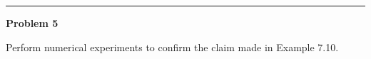 \documentclass[10pt]{article}
\begin{document}



\vskip 1cm
\hrule
{\bf Problem 5}


Perform numerical experiments to confirm the claim made in Example 7.10.



\end{document}
